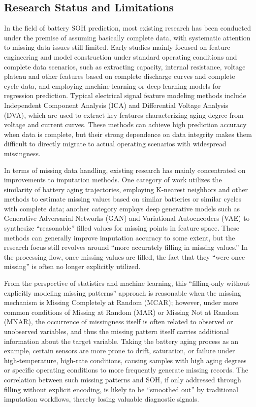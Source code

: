 \documentclass[10pt,a4paper]{article}
\begin{document}
\subsection{Research Status and Limitations}

In the field of battery SOH prediction, most existing research has been conducted under the premise of assuming basically complete data, with systematic attention to missing data issues still limited\cite{shao2025soh}. Early studies mainly focused on feature engineering and model construction under standard operating conditions and complete data scenarios, such as extracting capacity, internal resistance, voltage plateau and other features based on complete discharge curves and complete cycle data, and employing machine learning or deep learning models for regression prediction. Typical electrical signal feature modeling methods include Independent Component Analysis (ICA) and Differential Voltage Analysis (DVA), which are used to extract key features characterizing aging degree from voltage and current curves\cite{deng2025novel}. These methods can achieve high prediction accuracy when data is complete, but their strong dependence on data integrity makes them difficult to directly migrate to actual operating scenarios with widespread missingness.

In terms of missing data handling, existing research has mainly concentrated on improvements to imputation methods. One category of work utilizes the similarity of battery aging trajectories, employing K-nearest neighbors and other methods to estimate missing values based on similar batteries or similar cycles with complete data; another category employs deep generative models such as Generative Adversarial Networks (GAN) and Variational Autoencoders (VAE) to synthesize ``reasonable'' filled values for missing points in feature space. These methods can generally improve imputation accuracy to some extent, but the research focus still revolves around ``more accurately filling in missing values.'' In the processing flow, once missing values are filled, the fact that they ``were once missing'' is often no longer explicitly utilized.

From the perspective of statistics and machine learning, this ``filling-only without explicitly modeling missing patterns'' approach is reasonable when the missing mechanism is Missing Completely at Random (MCAR); however, under more common conditions of Missing at Random (MAR) or Missing Not at Random (MNAR), the occurrence of missingness itself is often related to observed or unobserved variables, and thus the missing pattern itself carries additional information about the target variable. Taking the battery aging process as an example, certain sensors are more prone to drift, saturation, or failure under high-temperature, high-rate conditions, causing samples with high aging degrees or specific operating conditions to more frequently generate missing records. The correlation between such missing patterns and SOH, if only addressed through filling without explicit encoding, is likely to be ``smoothed out'' by traditional imputation workflows, thereby losing valuable diagnostic signals.
\end{document}
